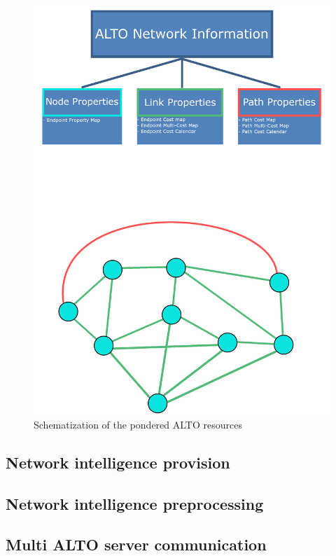 \begin{figure}[!h]
        \centering
        \includegraphics[scale=0.80]{img/architecture-resources.png}
        \caption{Schematization of the pondered ALTO resources}
        \label{fig:alto-resources}
\end{figure}

\subsection{Network intelligence provision}

\subsection{Network intelligence preprocessing}

\subsection{Multi ALTO server communication}
\label{ssec:multi-alto}

